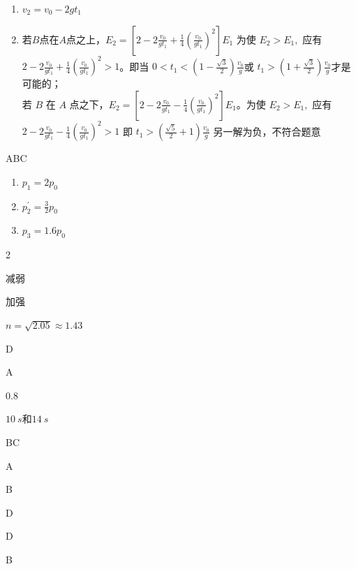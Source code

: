 \item \begin {enumerate} \renewcommand {\labelenumi }{\arabic {enumi}.} \item $v_{2}=v_{0}-2 g t_{1}$ \item 若$ B $点在$ A $点之上，$E_{2}=\left [2-2 \frac {v_{0}}{g t_{1}}+\frac {1}{4}\left (\frac {v_{0}}{g t_{1}}\right )^{2}\right ] E_{1}$ \quad 为使 $E_{2}>E_{1},$ 应有$2-2 \frac {v_{0}}{g t_{1}}+\frac {1}{4}\left (\frac {v_{0}}{g t_{1}}\right )^{2}>1$。即当 $0<t_{1}<\left (1-\frac {\sqrt {3}}{2}\right ) \frac {v_{0}}{g}$或 $t_{1}>\left (1+\frac {\sqrt {3}}{2}\right ) \frac {v_{0}}{g}$才是可能的； \\ 若 $B$ 在 $A$ 点之下，$E_{2}=\left [2-2 \frac {v_{0}}{g t_{1}}-\frac {1}{4}\left (\frac {v_{0}}{g t_{1}}\right )^{2}\right ] E_{1}$。为使 $E_{2}>E_{1},$ 应有 $2-2 \frac {v_{0}}{g t_{1}}-\frac {1}{4}\left (\frac {v_{0}}{g t_{1}}\right )^{2}>1$ 即 $t_{1}>\left (\frac {\sqrt {5}}{2}+1\right ) \frac {v_{0}}{g}$ 另一解为负，不符合题意 \par \par \end {enumerate} \par \par 
\item ABC
\item \begin {enumerate} \renewcommand {\labelenumi }{\arabic {enumi}.} \item $p_{1}=2 p_{0}$ \item $p_{2}^{\prime }=\frac {3}{2} p_{0}$ \item $p_{3}=1.6 p_{0}$ \par \end {enumerate} \par \par 
\item 2
\item 减弱
\item 加强
\item $n=\sqrt {2.05} \approx 1.43$
\item D
\item A
\item 0.8
\item $ 10 \ s $和$ 14 \ s $
\item BC
\item A
\item B
\item D
\item D
\item B
